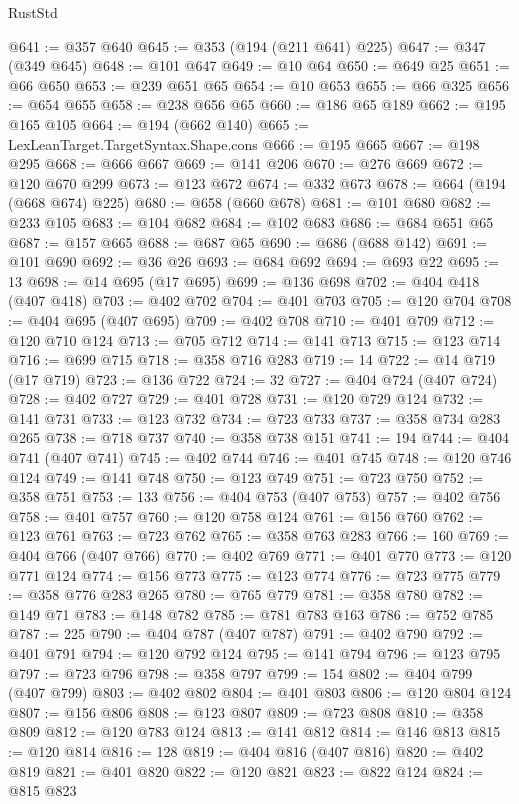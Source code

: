 \begin{lexlean}{RustStd}
\begin{coremodule}
@641 := @357 @640
@645 := @353 (@194 (@211 @641) @225)
@647 := @347 (@349 @645)
@648 := @101 @647
@649 := @10 @64
@650 := @649 @25
@651 := @66 @650
@653 := @239 @651 @65
@654 := @10 @653
@655 := @66 @325
@656 := @654 @655
@658 := @238 @656 @65
@660 := @186 @65 @189
@662 := @195 @165 @105
@664 := @194 (@662 @140)
@665 := LexLeanTarget.TargetSyntax.Shape.cons
@666 := @195 @665
@667 := @198 @295
@668 := @666 @667
@669 := @141 @206
@670 := @276 @669
@672 := @120 @670 @299
@673 := @123 @672
@674 := @332 @673
@678 := @664 (@194 (@668 @674) @225)
@680 := @658 (@660 @678)
@681 := @101 @680
@682 := @233 @105
@683 := @104 @682
@684 := @102 @683
@686 := @684 @651 @65
@687 := @157 @665
@688 := @687 @65
@690 := @686 (@688 @142)
@691 := @101 @690
@692 := @36 @26
@693 := @684 @692
@694 := @693 @22
@695 := 13
@698 := @14 @695 (@17 @695)
@699 := @136 @698
@702 := @404 @418 (@407 @418)
@703 := @402 @702
@704 := @401 @703
@705 := @120 @704
@708 := @404 @695 (@407 @695)
@709 := @402 @708
@710 := @401 @709
@712 := @120 @710 @124
@713 := @705 @712
@714 := @141 @713
@715 := @123 @714
@716 := @699 @715
@718 := @358 @716 @283
@719 := 14
@722 := @14 @719 (@17 @719)
@723 := @136 @722
@724 := 32
@727 := @404 @724 (@407 @724)
@728 := @402 @727
@729 := @401 @728
@731 := @120 @729 @124
@732 := @141 @731
@733 := @123 @732
@734 := @723 @733
@737 := @358 @734 @283 @265
@738 := @718 @737
@740 := @358 @738 @151
@741 := 194
@744 := @404 @741 (@407 @741)
@745 := @402 @744
@746 := @401 @745
@748 := @120 @746 @124
@749 := @141 @748
@750 := @123 @749
@751 := @723 @750
@752 := @358 @751
@753 := 133
@756 := @404 @753 (@407 @753)
@757 := @402 @756
@758 := @401 @757
@760 := @120 @758 @124
@761 := @156 @760
@762 := @123 @761
@763 := @723 @762
@765 := @358 @763 @283
@766 := 160
@769 := @404 @766 (@407 @766)
@770 := @402 @769
@771 := @401 @770
@773 := @120 @771 @124
@774 := @156 @773
@775 := @123 @774
@776 := @723 @775
@779 := @358 @776 @283 @265
@780 := @765 @779
@781 := @358 @780
@782 := @149 @71
@783 := @148 @782
@785 := @781 @783 @163
@786 := @752 @785
@787 := 225
@790 := @404 @787 (@407 @787)
@791 := @402 @790
@792 := @401 @791
@794 := @120 @792 @124
@795 := @141 @794
@796 := @123 @795
@797 := @723 @796
@798 := @358 @797
@799 := 154
@802 := @404 @799 (@407 @799)
@803 := @402 @802
@804 := @401 @803
@806 := @120 @804 @124
@807 := @156 @806
@808 := @123 @807
@809 := @723 @808
@810 := @358 @809
@812 := @120 @783 @124
@813 := @141 @812
@814 := @146 @813
@815 := @120 @814
@816 := 128
@819 := @404 @816 (@407 @816)
@820 := @402 @819
@821 := @401 @820
@822 := @120 @821
@823 := @822 @124
@824 := @815 @823

\end{coremodule}
\end{lexlean}
